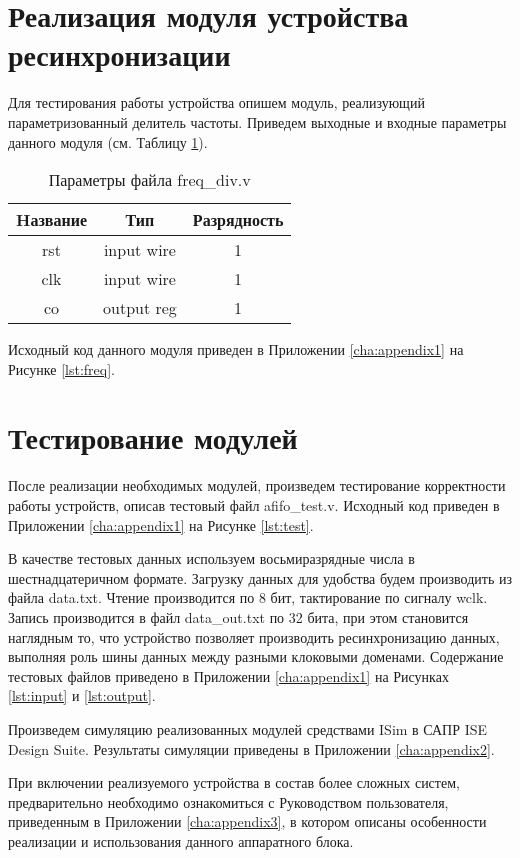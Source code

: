 \section{Реализация модуля устройства ресинхронизации}
Для тестирования работы устройства опишем модуль, реализующий параметризованный делитель частоты. Приведем выходные и входные параметры данного модуля (см. Таблицу \ref{tab:freq-params}).

\begin{table}[htbp]
	\caption{Параметры файла freq\_div.v}
	\centering
	\fontsize{12}{16pt}
	\begin{tabular}{|c|c|c|}
		\hline
		\multicolumn{1}{|c}{\textbf{Hазвание}}& \multicolumn{1}{|c}{\textbf{Тип}} & \multicolumn{1}{|c|}{\textbf{Разрядность}} \\ \hline
		rst & input wire & 1 \\ \hline
		clk & input wire & 1 \\ \hline
		co & output reg & 1 \\ \hline
	\end{tabular}
	\label{tab:freq-params}
\end{table}

Исходный код данного модуля приведен в Приложении \ref{cha:appendix1} на Рисунке \ref{lst:freq}.

\section{Тестирование модулей}
После реализации необходимых модулей, произведем тестирование корректности работы устройств, описав тестовый файл afifo\_test.v. Исходный код приведен в Приложении \ref{cha:appendix1} на Рисунке \ref{lst:test}.

В качестве тестовых данных используем восьмиразрядные числа в шестнадцатеричном формате. Загрузку данных для удобства будем производить из файла data.txt. Чтение производится по 8 бит, тактирование по сигналу wclk. Запись производится в файл data\_out.txt по 32 бита, при этом становится наглядным то, что устройство позволяет производить ресинхронизацию данных, выполняя роль шины данных между разными клоковыми доменами. Содержание тестовых файлов приведено в Приложении \ref{cha:appendix1} на Рисунках \ref{lst:input} и \ref{lst:output}.

Произведем симуляцию реализованных модулей средствами ISim в САПР ISE Design Suite. Результаты симуляции приведены в Приложении \ref{cha:appendix2}.

При включении реализуемого устройства в состав более сложных систем, предварительно необходимо ознакомиться с Руководством пользователя, приведенным в Приложении \ref{cha:appendix3}, в котором описаны особенности реализации и использования данного аппаратного блока.









